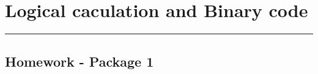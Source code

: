 \section{Logical caculation and Binary code}
\vspace{-15pt}\noindent\rule{\textwidth}{0.1pt}\vspace{-10pt}
    \subsection*{Homework - Package 1}